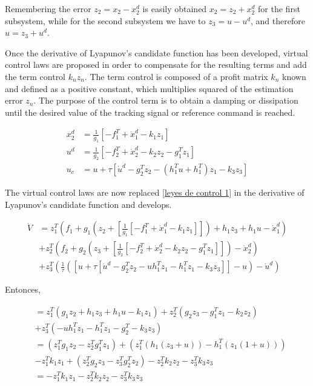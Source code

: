 Remembering the error $z_2 = x_2 - x^d_2$ is easily obtained $x_2 = z_2 + x^d_2$ for the first subsystem, while for the second subsystem we have to $z_3 = u - u^d$, and therefore $u = z_3 + u^d$. 

Once the derivative of Lyapunov's candidate function has been developed, virtual control laws are proposed in order to compensate for the resulting terms and add the term control $k_n z_n$. The term control is composed of a profit matrix $k_n$ known and defined as a positive constant, which multiplies squared of the estimation error $z_n$. The purpose of the control term is to obtain a damping or dissipation until the desired value of the tracking signal or reference command is reached. 

\begin{align}
\label{leyes de control 1}
    x^d_2 &= \frac{1}{g_{1}} [- f^T_1 + \dot x^d_1 - k_1 z_1] \nonumber \\
    u^d &= \frac{1}{g_{2}} [-f_{2}^T + \dot x_{2}^d - k_2 z_2 - g_{1}^T z_1] \nonumber \\
    u_c &= u + \tau [\dot u^d - g_{2}^T z_2 - (h_1^T u + h_{1}^T) z_1 - k_3 z_3]
\end{align}

The virtual control laws are now replaced \ref{leyes de control 1} in the derivative of Lyapunov's candidate function and develops.

\begin{align}
      \dot V &=  z^T_1 (f_1 + g_{1} (z_2 + [\frac{1}{g_{1}} [- f^T_1  + \dot x^d_1 - k_1 z_1]]) + h_1 z_3 + h_1 u - \dot x^d_1) \nonumber \\
      &+ z^T_2 (f_2 + g_{2} (z_3 + [\frac{1}{g_{2}} [-f_{2}^T + \dot x_{2}^d - k_2 z_2 - g_{1}^T z_1]]) - \dot x^d_2) \nonumber \\
      &+ z^T_3 (\frac{1}{\tau}([ u + \tau [\dot u^d - g_{2}^T z_2 - u h_1^T z_1 - h_{1}^T z_1 - k_3 z_3]] - u) - \dot u^d)
\end{align}

Entonces,

\begin{align}
    &= z^T_1 (g_1 z_2  + h_1 z_3 + h_1 u - k_1 z_1) + z^T_2 (g_2 z_3 - g^T_1 z_1 - k_2 z_2) \nonumber \\
      &+ z^T_3 (- u h_1^T z_1 - h_1^T z_1  - g_{2}^T - k_3 z_3) \nonumber \\
      &= (z^T_1g_1 z_2 - z^T_2 g^T_1 z_1 ) + (z_1^T(h_1 (z_3 + u)) - h_1^T(z_1(1+u))) \nonumber \\
      &- z^T_1 k_1 z_1 + (z^T_2 g_2 z_3 - z^T_3 g_{2}^T z_2 ) -  z^T_2 k_2 z_2 - z^T_3  k_3 z_3 \nonumber \\
      &= - z^T_1 k_1 z_1 - z^T_2 k_2 z_2 -  z^T_3  k_3 z_3
\label{backstepping eq}
\end{align}

